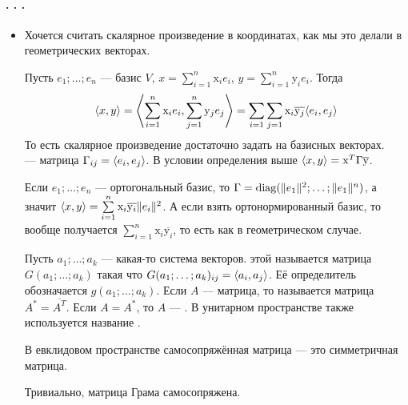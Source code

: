 \documentclass{article}
\begin{document}
    \paragraph{. . .}
    \begin{itemize}
        \item[]
        \begin{Comment}
            Хочется считать скалярное произведение в координатах, как мы это делали в геометрических векторах.
        \end{Comment}
        \dfn Пусть $e_1;\ldots;e_n$ --- базис $V$, $x=\sum\limits_{i=1}^n\mathrm x_ie_i$, $y=\sum\limits_{i=1}^n\mathrm y_ie_i$. Тогда
        \[
        {\left\langle{x},{y}\right\rangle}={\left\langle{\sum\limits_{i=1}^n\mathrm x_ie_i},{\sum\limits_{j=1}^n\mathrm y_je_j}\right\rangle}=\sum\limits_{i=1}\sum\limits_{j=1}\mathrm x_i\overline{\mathrm y_j}{\left\langle{e_i},{e_j}\right\rangle}
        \]
        То есть скалярное произведение достаточно задать на базисных векторах.\\
         --- матрица $\Gamma_{ij}={\left\langle{e_i},{e_j}\right\rangle}$.
        \thm В условии определения выше ${\left\langle{x},{y}\right\rangle}=\mathrm x^T\Gamma\overline{\mathrm y}$.
        \begin{Example}
            Если $e_1;\ldots;e_n$ --- ортогональный базис, то $\Gamma=\operatorname{diag}(\|e_1\|^2;\ldots;\|e_1\|^n)$, а значит ${\left\langle{x},{y}\right\rangle}=\sum\limits_{i=1}^n\mathrm x_i\overline{\mathrm y_i}\|e_i\|^2$. А если взять ортонормированный базис, то вообще получается $\sum\limits_{i=1}^n\mathrm x_i\overline{\mathrm y_i}$, то есть как в геометрическом случае.
        \end{Example}
        \dfn Пусть $a_1;\ldots;a_k$ --- какая-то система векторов.  этой  называется матрица $G(a_1;\ldots;a_k)$ такая что $G(a_1;\ldots;a_k)_{ij}={\left\langle{a_i},{a_j}\right\rangle}$. Её определитель обозначается $g(a_1;\ldots;a_k)$.
        \dfn Если $A$ --- матрица, то  называется матрица $A^*=\overline{A^T}$.
        \dfn Если $A=A^*$, то $A$ --- . В унитарном пространстве также используется название .
        \begin{Comment}
            В евклидовом пространстве самосопряжённая матрица --- это симметричная матрица.
        \end{Comment}
        \thm Тривиально, матрица Грама самосопряжена.

\end{itemize}
\end{document}
